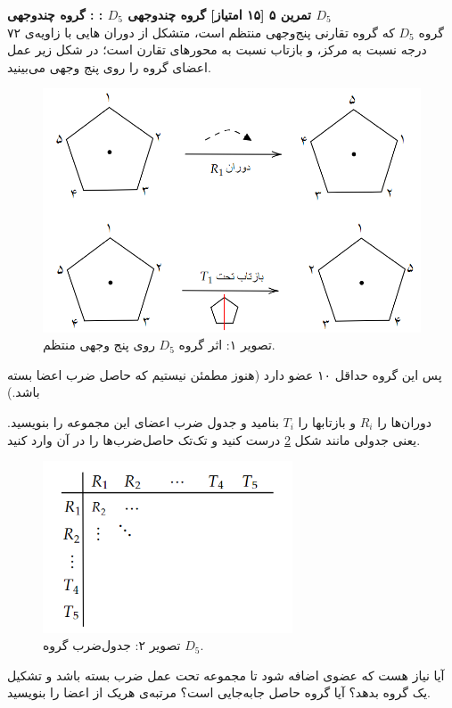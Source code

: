 \documentclass{article}
\newenvironment{exercise}[3][\unskip]{%
	\par
	\noindent
	\textbf{تمرین
		#1
		[#2 امتیاز] 
		\def\temp{#3}\ifx\temp\empty
		: 
		\else
		: #3 \vspace{0.5em} \\ \noindent
		\fi
}}{}
\begin{document}
\begin{exercise}[۵]{۱۵}{
	گروه چندوجهی 
	$D_5$
	}
	گروه 
	$D_5$
	که گروه تقارنی پنج‌وجهی منتظم است، متشکل از دوران هایی با زاویه‌ی ۷۲ درجه نسبت به مرکز، و بازتاب نسبت به محورهای تقارن است؛ در شکل زیر عمل اعضای گروه را روی پنج وجهی می‌بینید.
	\begin{figure}
		\centering
		\includegraphics[width=35em]{1.png}
		\captionsetup{labelformat=empty}
		\caption{تصویر ۱: اثر گروه 
		$D_5$
		روی پنج وجهی منتظم.
		}
		\label{fig1}
	\end{figure}
	پس این گروه حداقل ۱۰ عضو دارد (هنوز مطمئن نیستیم که حاصل ضرب اعضا بسته باشد.)
	
	\noindent
	دوران‌ها را $R_i$ و بازتابها را $T_i$ بنامید و جدول ضرب اعضای این مجموعه را بنویسید. یعنی جدولی مانند شکل 
	\ref*{fig2}
	 درست کنید و تک‌‌‌تک حاصل‌ضرب‌ها را در آن وارد کنید.
	
	\begin{figure}[h]
		\centering
		\includegraphics[width=20em]{2.png}
		\captionsetup{labelformat=empty}
		\caption{تصویر ۲: جدول‌ضرب گروه 
			$D_5$.
		}
		\label{fig2}
	\end{figure}
	\noindent
	آیا نیاز هست که عضوی اضافه شود تا مجموعه تحت عمل ضرب بسته باشد و تشکیل یک گروه بدهد؟ آیا گروه حاصل جابه‌جایی است؟ مرتبه‌ی هریک از اعضا را بنویسید.
	

\end{exercise}
\end{document}
